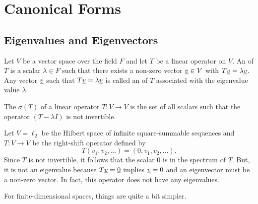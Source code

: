 \chapter{Canonical Forms}

\section{Eigenvalues and Eigenvectors}

\begin{definition}
Let $V$ be a vector space over the field $F$ and let $T$ be a linear operator on $V$.
An  of $T$ is a scalar $\lambda \in F$ such that there exists a non-zero vector $\underline{v} \in V$ with $T \underline{v} = \lambda \underline{v}$.
Any vector $\underline{v}$ such that $T \underline{v} = \lambda \underline{v}$ is called an  of $T$ associated with the eigenvalue value $\lambda$.
\end{definition}

\begin{definition}
The  $\sigma(T)$ of a linear operator $T \colon V \rightarrow V$ is the set of all scalars such that the operator $(T-\lambda I)$ is not invertible.
\end{definition}

\begin{example}
Let $V=\ell_2$ be the Hilbert space of infinite square-summable sequences and $T:V\rightarrow V$ be the right-shift operator defined by
\[ T (v_1,v_2,\ldots) = (0,v_1,v_2,\ldots). \]
Since $T$ is not invertible, it follows that the scalar $0$ is in the spectrum of $T$.
But, it is not an eigenvalue because $T \underline{v} = \underline{0}$ implies $\underline{v} = 0$ and an eigenvector must be a non-zero vector.
In fact, this operator does not have any eigenvalues.
\end{example}

For finite-dimensional spaces, things are quite a bit simpler.

